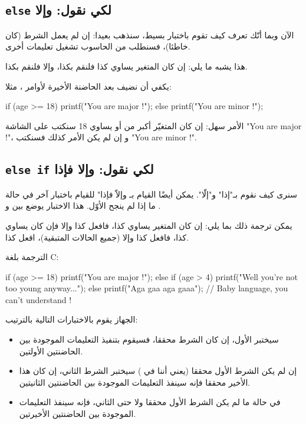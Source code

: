 \subsection{\texttt{else}
لكي نقول: وإلا}

الآن وبما أنّك تعرف كيف تقوم باختبار بسيط، سنذهب بعيدا: إن لم يعمل الشرط (كان خاطئا)، فسنطلب من الحاسوب تشغيل تعليمات أخرى.

هذا يشبه ما يلي: إن كان المتغير يساوي كذا فلنقم بكذا، وإلا فلنقم بكذا.

يكفي أن نضيف
بعد الحاضنة الأخيرة لأوامر ،
مثلا:
\begin{Csource}
if (age >= 18)
{
	printf("You are major !");
}
else {
	printf("You are minor !");
}
\end{Csource}

الأمر سهل: إن كان المتغيّر
أكبر من أو يساوي 18 سنكتب على الشاشة 
"\textenglish{You are major !}"،
و إن لم يكن الأمر كذلك فسنكتب 
"\textenglish{You are minor !}".

\subsection{\texttt{else if}
لكي نقول: وإلا فإذا}

سنرى كيف نقوم بـ"إذا" و"إلّا". يمكن أيضًا القيام بـ وإلاّ فإذا" للقيام باختبار آخر في حالة ما إذا لم ينجح الأوّل. هذا الاختبار يوضع بين
و
.

يمكن ترجمة ذلك بما يلي: إن كان المتغير يساوي كذا، فافعل كذا وإلا فإن كان يساوي كذا، فافعل كذا وإلا (جميع الحالات المتبقية)، افعل كذا.

الترجمة بلغة
\textenglish{C}:

\begin{Csource}
if (age >= 18)
{
	printf("You are major !");
}
else if (age > 4)
{
	printf("Well you're not too young anyway...");
}
else
{
	printf("Aga gaa aga gaaa");
	// Baby language, you can't understand !
}
\end{Csource}

الجهاز يقوم بالاختبارات التالية بالترتيب:
\begin{itemize}
\item سيختبر 
الأول، إن كان الشرط محققا، فسيقوم بتنفيذ التعليمات الموجودة بين الحاضنتين الأولتين.
\item إن لم يكن الشرط الأول محققا (يعني أننا في )
سيختبر الشرط الثاني، إن كان هذا الأخير محققا فإنه سينفذ التعليمات الموجودة بين الحاضنتين الثانيتين.
\item في حالة ما لم يكن الشرط الأول محققا ولا حتى الثاني، فإنه سينفذ التعليمات الموجودة بين الحاضنتين الأخيرتين.
\end{itemize}

